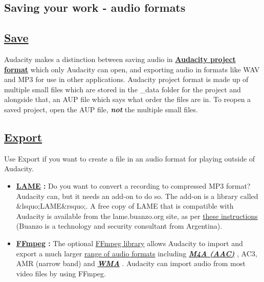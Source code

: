 \documentclass[]{book}
\begin{document}
\begin{multicols}{2}
\section{Saving your work - audio formats}


\subsection{
\hyperref[file_menu__save]{Save}
}


Audacity makes a distinction between saving audio in \textbf{
\hyperref[audacity_projects_]{Audacity project format}
} which only Audacity can open, and exporting audio in formats like WAV and MP3 for use in other applications. Audacity project format is made up of multiple small files which are stored in the \_data folder for the project and alongside that, an  AUP file which says what order the files are in. To reopen a saved project, open the AUP file, \textit{\textbf{not}} the multiple small files. 

\subsection{
\hyperref[file_export_dialog_]{Export}
}


Use Export if you want to create a file in an audio format for playing outside of Audacity.
\begin{itemize}
\item  \textbf{
\hyperref[faq_installation_and_plug_ins__lame]{LAME}
:} Do you want to convert a recording to compressed MP3 format? Audacity can, but it needs an add-on to do so.  The add-on is a library called \&lsquo;LAME\&rsquo;.  A free copy of LAME that is compatible with Audacity is available from the   lame.buanzo.org site, as per 
\hyperref[faq_installation_and_plug_ins__lame]{these instructions}
 (Buanzo is a technology and security consultant from Argentina). 
\item  \textbf{
\hyperref[faq_installation_and_plug_ins__ffdown]{FFmpeg}
:} The optional 
\hyperref[faq_opening_and_saving_files__foreign]{FFmpeg library}
 allows Audacity to import and export a much larger 
\hyperref[https:__wiki.audacityteam.org_wiki_FFmpeg_integration_Functionality]{range of audio formats}
 including \textit{\textbf{
\hyperref[glossary__aac]{M4A (AAC)}
}}, AC3, AMR (narrow band) and \textit{\textbf{
\hyperref[glossary__wma]{WMA}
}}. Audacity can import audio from most video files by using FFmpeg.
\end{itemize}



\end{multicols}
\end{document}
